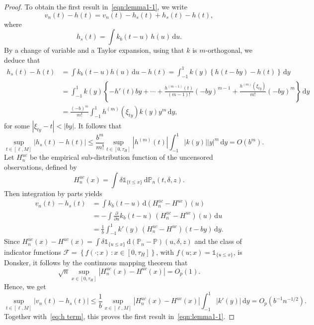 \documentclass[11pt,reqno]{amsart}
\theoremstyle{definition}
\theoremstyle{plain}
\theoremstyle{remark}
\begin{document}
\begin{proof}
To obtain the first result in~\eqref{eqn:lemma1-1}, we write
\[
v_n(t)-h(t)=v_n(t)-h_s(t)+h_s(t)-h(t),
\]
where
\begin{equation}
\label{def:hs}
h_s(t)=\int k_b(t-u)\,h(u)\,\mathrm{d}u.
\end{equation}
By a change of variable and a Taylor expansion, using that $k$ is $m$-orthogonal,
we deduce that
\begin{equation}
\label{eq:taylor h}
\begin{split}
h_s(t)-h(t)
&=
\int k_b(t-u)h(u)\,\mathrm{d}u-h(t)
=
\int_{-1}^1 k(y)
\left\{
h(t-by)-h(t)
\right\}\,\mathrm{d}y\\
&=
\int_{-1}^1 k(y)
\left\{
-h'(t)by+\cdots+\frac{h^{(m-1)}(t)}{(m-1)!}(-by)^{m-1}+\frac{h^{(m)}(\xi_{ty})}{m!}(-by)^m
\right\}\,\mathrm{d}y\\
&=
\frac{(-b)^m}{m!}
\int_{-1}^1
h^{(m)}(\xi_{ty})k(y)y^m\,\mathrm{d}y,
\end{split}
\end{equation}
for some $|\xi_{ty}-t|<|by|$.
It follows that
\begin{equation}
\label{eq:h term}
\sup_{t\in[\ell,M]}|h_s(t)-h(t)|
\leq
\frac{b^m}{m!}
\sup_{t\in[0,\tau_H]}\left|h^{(m)}(t)\right|
\int_{-1}^1
|k(y)||y|^m\,\mathrm{d}y
=
O(b^m).
\end{equation}
Let $H^{uc}_n$ be the empirical sub-distribution function of the uncensored observations, defined by
\[
H_n^{uc}(x)
=
\int \delta {\mathds{1}}_{\{t\leq x\}}\,\mathrm{d}{\mathbb{P}}_n(t,\delta,z).
\]
Then integration by parts yields
\begin{equation}
\label{eq:v minus h}
\begin{split}
v_n(t)-h_s(t)&=\int k_b(t-u)\,\mathrm{d}(H^{uc}_n-H^{uc})(u)\\
&=
-\int \frac{\partial}{\partial u}k_b(t-u)\,(H^{uc}_n-H^{uc})(u)\,\mathrm{d}u\\
&=
\frac{1}{b}\int_{-1}^1 k'(y)\,(H^{uc}_n-H^{uc})(t-by)\,\mathrm{d}y.
\end{split}
\end{equation}
Since
$H^{uc}_n(x)-H^{uc}(x)=\int \delta{\mathds{1}}_{\{u\leq x\}}\,\mathrm{d}({\mathbb{P}}_n-{\mathbb{P}})(u,\delta,z)$
and the class of indicator functions ${\mathcal{F}}=\left\{f(\cdot;x)\,:x\in[0,\tau_H]\right\}$,
with $f(u;x)={\mathds{1}}_{\{u\leq x\}}$,  is  Donsker, it follows by the continuous mapping theorem that
\begin{equation}
\label{eqn:H_uc}
\sqrt{n}\sup_{x\in[0,\tau_H]}|H^{uc}_n(x)-H^{uc}(x)|=O_p(1).
\end{equation}
Hence, we get
\begin{equation}
\label{eq:v minus h limit}
\sup_{t\in[\ell,M]}|v_n(t)-h_s(t)|
\leq
\frac{1}{b}
\sup_{x\in[\ell,M]}|H^{uc}_n(x)-H^{uc}(x)|
\int_{-1}^1 |k'(y)|\,\mathrm{d}y
=
O_p(b^{-1}n^{-1/2}).
\end{equation}
Together with~\eqref{eq:h term}, this proves the first result in~\eqref{eqn:lemma1-1}.


\end{proof}
\end{document}
